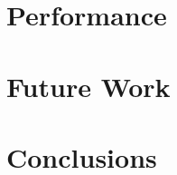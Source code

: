 \documentclass[paper=a4, fontsize=11pt]{scrartcl} %
\numberwithin{equation}{section} %
\numberwithin{figure}{section} %
\numberwithin{table}{section} %
\begin{document}
\section{Performance}
\label{sec:performance}


\section{Future Work}
\label{sec:future-work}

\section{Conclusions}
\label{sec:conclusions}

\end{document}
